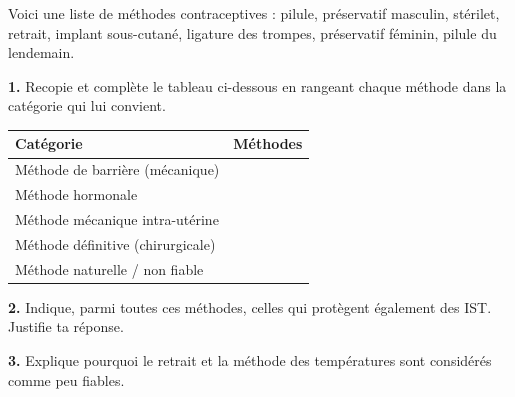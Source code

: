 \documentclass[11pt]{article}
\begin{document}
\begin{exercice}
Voici une liste de méthodes contraceptives : pilule, préservatif masculin, stérilet, retrait, implant sous-cutané, ligature des trompes, préservatif féminin, pilule du lendemain.

\textbf{1.} Recopie et complète le tableau ci-dessous en rangeant chaque méthode dans la catégorie qui lui convient.

\begin{center}
\begin{tabularx}{\linewidth}{|l|X|}
\hline
\rowcolor{popblueL} \textbf{Catégorie} & \textbf{Méthodes} \\
\hline
Méthode de barrière (mécanique) & \\
\hline
Méthode hormonale & \\
\hline
Méthode mécanique intra-utérine & \\
\hline
Méthode définitive (chirurgicale) & \\
\hline
Méthode naturelle / non fiable & \\
\hline
\end{tabularx}
\end{center}

\textbf{2.} Indique, parmi toutes ces méthodes, celles qui protègent également des IST. Justifie ta réponse.

\textbf{3.} Explique pourquoi le retrait et la méthode des températures sont considérés comme peu fiables.
\end{exercice}
\end{document}
